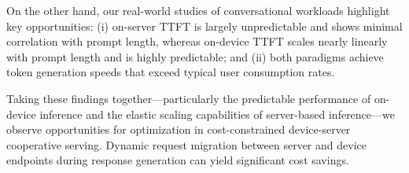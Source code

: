 On the other hand, our real-world studies of conversational workloads highlight key opportunities: (i) on-server TTFT is largely unpredictable and shows minimal correlation with prompt length, whereas on-device TTFT scales nearly linearly with prompt length and is highly predictable; and (ii) both paradigms achieve token generation speeds that exceed typical user consumption rates.

Taking these findings together---particularly the predictable performance of on-device inference and the elastic scaling capabilities of server-based inference---we observe opportunities for optimization in cost-constrained device-server cooperative serving. Dynamic request migration between server and device endpoints during response generation can yield significant cost savings. 
